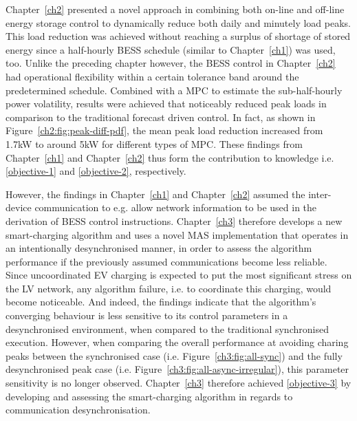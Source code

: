 Chapter~\ref{ch2} presented a novel approach in combining both on-line and off-line energy storage control to dynamically reduce both daily and minutely load peaks.
This load reduction was achieved without reaching a surplus of shortage of stored energy since a half-hourly BESS schedule (similar to Chapter~\ref{ch1}) was used, too.
Unlike the preceding chapter however, the BESS control in Chapter~\ref{ch2} had operational flexibility within a certain tolerance band around the predetermined schedule.
Combined with a MPC to estimate the sub-half-hourly power volatility, results were achieved that noticeably reduced peak loads in comparison to the traditional forecast driven control.
In fact, as shown in Figure~\ref{ch2:fig:peak-diff-pdf}, the mean peak load reduction increased from 1.7kW to around 5kW for different types of MPC.
These findings from Chapter~\ref{ch1} and Chapter~\ref{ch2} thus form the contribution to knowledge i.e. \ref{objective-1} and \ref{objective-2}, respectively.

However, the findings in Chapter~\ref{ch1} and Chapter~\ref{ch2} assumed the inter-device communication to e.g. allow network information to be used in the derivation of BESS control instructions.
Chapter~\ref{ch3} therefore develops a new smart-charging algorithm and uses a novel MAS implementation that operates in an intentionally desynchronised manner, in order to assess the algorithm performance if the previously assumed communications become less reliable.
Since uncoordinated EV charging is expected to put the most significant stress on the LV network, any algorithm failure, i.e. to coordinate this charging, would become noticeable.
And indeed, the findings indicate that the algorithm's converging behaviour is less sensitive to its control parameters in a desynchronised environment, when compared to the traditional synchronised execution.
However, when comparing the overall performance at avoiding charing peaks between the synchronised case (i.e. Figure~\ref{ch3:fig:all-sync}) and the fully desynchronised peak case (i.e. Figure~\ref{ch3:fig:all-async-irregular}), this parameter sensitivity is no longer observed.
Chapter~\ref{ch3} therefore achieved \ref{objective-3} by developing and assessing the smart-charging algorithm in regards to communication desynchronisation.

